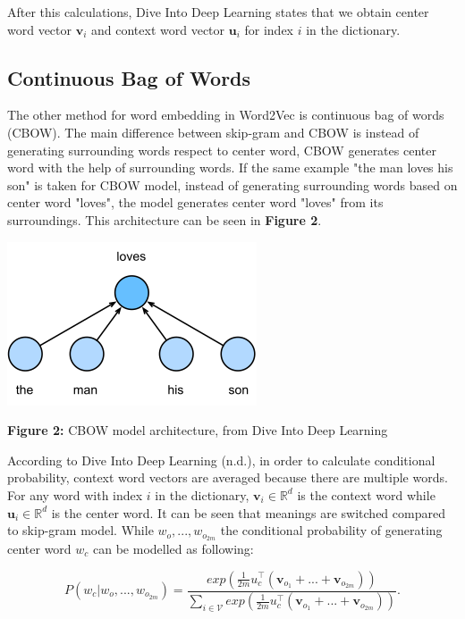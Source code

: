 \documentclass[man]{apa7}
\begin{document}
After this calculations, Dive Into Deep Learning states that we obtain center word vector $\mathbf{v}_i$ and context word vector $\mathbf{u}_i$ for index $i$ in the dictionary.

\subsection{Continuous Bag of Words}

The other method for word embedding in Word2Vec is continuous bag of words (CBOW). The main difference between skip-gram and CBOW is instead of generating surrounding words respect to center word, CBOW generates center word with the help of surrounding words. If the same example "the man loves his son" is taken for CBOW model, instead of generating surrounding words based on center word "loves", the model generates center word "loves" from its surroundings. This architecture can be seen in \textbf{Figure 2}.
\\[2\baselineskip]

\begin{center}
\includegraphics[scale=1]{cbow.png}

\textbf{Figure 2:} CBOW model architecture, from Dive Into Deep Learning\\[2\baselineskip]

\end{center}

According to Dive Into Deep Learning (n.d.), in order to calculate conditional probability, context word vectors are averaged because there are multiple words. For any word with index $i$ in the dictionary, $\mathbf{v_\mathit{i}} \in \mathbb{R}^d$ is the context word while $\mathbf{u_\mathit{i}} \in \mathbb{R}^d$  is the center word. It can be seen that meanings are switched compared to skip-gram model. While $w_o,...,w_{o_{2m}}$ the conditional probability of generating center word $w_c$ can be modelled as following:

\begin{equation}
P(w_c|w_o,...,w_{o_{2m}}) = \frac{exp(\frac{1}{2m}u_c^\top(\mathbf{v}_{o_1}+...+\mathbf{v}_{o_{2m}}))}{\sum_{i \in \mathcal{V}} exp(\frac{1}{2m}u_c^\top(\mathbf{v}_{o_1}+...+\mathbf{v}_{o_{2m}}))}.
\end{equation}
\end{document}
